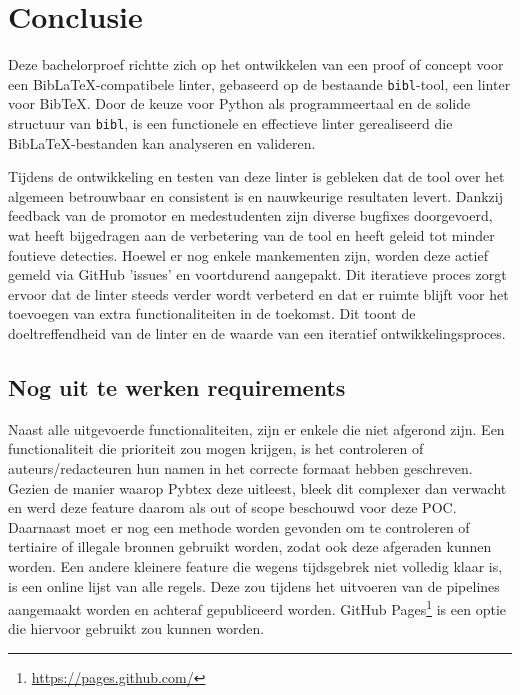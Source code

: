 
\chapter{Conclusie}%
\label{ch:conclusie}



Deze bachelorproef richtte zich op het ontwikkelen van een proof of concept voor een BibLaTeX-compatibele linter, gebaseerd op de bestaande \texttt{bibl}-tool, een linter voor BibTeX. Door de keuze voor Python als programmeertaal en de solide structuur van \texttt{bibl}, is een functionele en effectieve linter gerealiseerd die BibLaTeX-bestanden kan analyseren en valideren.

Tijdens de ontwikkeling en testen van deze linter is gebleken dat de tool over het algemeen betrouwbaar en consistent is en nauwkeurige resultaten levert. Dankzij feedback van de promotor en medestudenten zijn diverse bugfixes doorgevoerd, wat heeft bijgedragen aan de verbetering van de tool en heeft geleid tot minder foutieve detecties. Hoewel er nog enkele mankementen zijn, worden deze actief gemeld via GitHub 'issues' en voortdurend aangepakt. Dit iteratieve proces zorgt ervoor dat de linter steeds verder wordt verbeterd en dat er ruimte blijft voor het toevoegen van extra functionaliteiten in de toekomst. Dit toont de doeltreffendheid van de linter en de waarde van een iteratief ontwikkelingsproces.
\section{Nog uit te werken requirements}
Naast alle uitgevoerde functionaliteiten, zijn er enkele die niet afgerond zijn. Een functionaliteit die prioriteit zou mogen krijgen, is het controleren of auteurs/redacteuren hun namen in het correcte formaat hebben geschreven. Gezien de manier waarop Pybtex deze uitleest, bleek dit complexer dan verwacht en werd deze feature daarom als out of scope beschouwd voor deze POC. Daarnaast moet er nog een methode worden gevonden om te controleren of tertiaire of illegale bronnen gebruikt worden, zodat ook deze afgeraden kunnen worden. Een andere kleinere feature die wegens tijdsgebrek niet volledig klaar is, is een online lijst van alle regels. Deze zou tijdens het uitvoeren van de pipelines aangemaakt worden en achteraf gepubliceerd worden. GitHub Pages\footnote{\url{https://pages.github.com/}} is een optie die hiervoor gebruikt zou kunnen worden.

